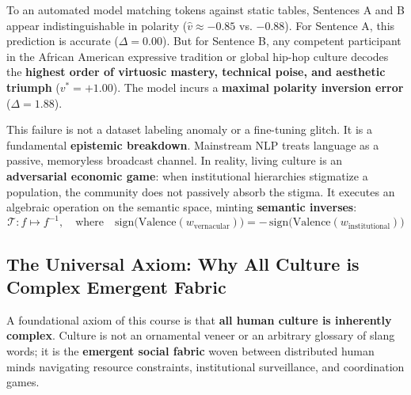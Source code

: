\documentclass[11pt,letterpaper]{article}
\begin{document}
To an automated model matching tokens against static tables, Sentences A and B appear indistinguishable in polarity ($\hat{v} \approx -0.85$ vs. $-0.88$). For Sentence A, this prediction is accurate ($\Delta = 0.00$). But for Sentence B, any competent participant in the African American expressive tradition or global hip-hop culture decodes the \textbf{highest order of virtuosic mastery, technical poise, and aesthetic triumph} ($v^* = +1.00$). The model incurs a \textbf{maximal polarity inversion error} ($\Delta = 1.88$).

This failure is not a dataset labeling anomaly or a fine-tuning glitch. It is a fundamental \textbf{epistemic breakdown}. Mainstream NLP treats language as a passive, memoryless broadcast channel. In reality, living culture is an \textbf{adversarial economic game}: when institutional hierarchies stigmatize a population, the community does not passively absorb the stigma. It executes an algebraic operation on the semantic space, minting \textbf{semantic inverses}:
\begin{equation}
    \mathcal{T}: f \mapsto f^{-1}, \quad \text{where} \quad \text{sign}\big(\text{Valence}(w_{\text{vernacular}})\big) = -\,\text{sign}\big(\text{Valence}(w_{\text{institutional}})\big)
\end{equation}

\subsection{The Universal Axiom: Why All Culture is Complex Emergent Fabric}
A foundational axiom of this course is that \textbf{all human culture is inherently complex}. Culture is not an ornamental veneer or an arbitrary glossary of slang words; it is the \textbf{emergent social fabric} woven between distributed human minds navigating resource constraints, institutional surveillance, and coordination games.
\end{document}
